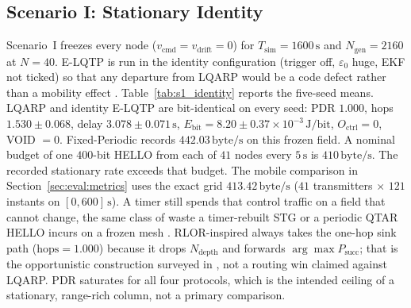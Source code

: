 \subsection{Scenario I: Stationary Identity}
\label{sec:eval:s1}
Scenario~I freezes every node
($v_{\mathrm{cmd}}=v_{\mathrm{drift}}=0$)
for $T_{\mathrm{sim}}=1600\,\mathrm{s}$ and $N_{\mathrm{gen}}=2160$
at $N=40$.
E-LQTP is run in the identity configuration (trigger off,
$\varepsilon_0$ huge, EKF not ticked) so that any departure from
LQARP would be a code defect rather than a mobility effect
\cite{liu2026lqarp}.
Table~\ref{tab:s1_identity} reports the five-seed means.
LQARP and identity E-LQTP are bit-identical on every seed: PDR
$1.000$, hops $1.530\pm 0.068$, delay $3.078\pm 0.071\,\mathrm{s}$,
$E_{\mathrm{bit}}=8.20\pm 0.37\times 10^{-3}\,\mathrm{J/bit}$,
$O_{\mathrm{ctrl}}=0$, VOID $=0$.
Fixed-Periodic records $442.03\,\mathrm{byte/s}$ on this frozen
field.
A nominal budget of one $400$-bit HELLO from each of $41$ nodes
every $5\,\mathrm{s}$ is $410\,\mathrm{byte/s}$.
The recorded stationary rate exceeds that budget.
The mobile comparison in Section~\ref{sec:eval:metrics} uses the
exact grid $413.42\,\mathrm{byte/s}$ ($41$ transmitters $\times$
$121$ instants on $[0,600]\,\mathrm{s}$).
A timer still spends that control traffic on a field that cannot
change, the same class of waste a timer-rebuilt STG or a periodic
QTAR HELLO incurs on a frozen mesh
\cite{xu2025stgr,nandyala2023qtar}.
RLOR-inspired always takes the one-hop sink path
($\mathrm{hops}=1.000$) because it drops $N_{\mathrm{depth}}$ and
forwards $\arg\max P_{\mathrm{succ}}$; that is the opportunistic
construction surveyed in \cite{jiang2023orsurvey}, not a routing
win claimed against LQARP.
PDR saturates for all four protocols, which is the intended ceiling
of a stationary, range-rich column, not a primary comparison.


